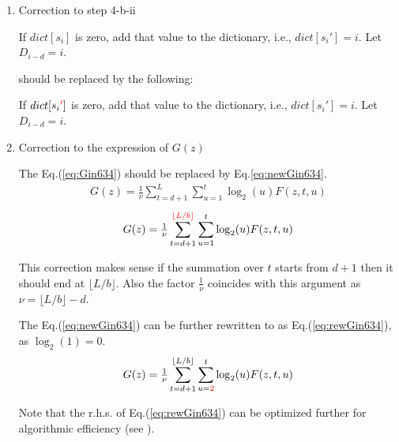 ﻿\documentclass[a4paper,xelatex,english]{bxjsreport}
\begin{document}
\begin{enumerate}
	\item Correction to step 4-b-ii

\begin{shadebox}
\begin{algorithmic}
\State If $dict[s_{i}]$ is zero, add that value to the dictionary, i.e., $dict[s_{i}'] =i$. Let $D_{i-d} = i$.
\end{algorithmic}
\end{shadebox}
should be replaced by the following:
\begin{shadebox}
\begin{algorithmic}
\State If $dict[s_{i} \textcolor{red}{'}]$ is zero, add that value to the dictionary, i.e., $dict[s_{i}'] =i$. Let $D_{i-d} = i$.
\end{algorithmic}
\end{shadebox}

	\item Correction to the expression of $G(z)$

The Eq.(\ref{eq:Gin634}) should be replaced by Eq.\ref{eq:newGin634}.
\begin{align}
G(z) = \tfrac{1}{\nu} 
\sum_{t = d + 1}^{L} 
\sum_{u = 1}^{t} 
\log_{2}(u) F(z, t, u)  \label{eq:Gin634}
\end{align}
\begin{align}
G(z) = \tfrac{1}{\nu} 
\sum_{t = d + 1}^{ \textcolor{red}{\lfloor L / b \rfloor}} 
\sum_{u = 1}^{t} 
\log_{2}(u) F(z, t, u)  \label{eq:newGin634}
\end{align}

This correction makes sense if the summation over $t$ starts from $d + 1$ then it should end at $\lfloor L / b \rfloor$.  Also the factor $\tfrac{1}{\nu}$ coincides with this argument as $\nu = \lfloor L / b \rfloor - d$.

The Eq.(\ref{eq:newGin634}) can be further rewritten to as Eq.(\ref{eq:rewGin634}), as $\log_{2}(1) = 0$.
\begin{align}
G(z) = \tfrac{1}{\nu} 
\sum_{t = d + 1}^{\lfloor L / b \rfloor} 
\sum_{u = \textcolor{red}{2}}^{t} 
\log_{2}(u) F(z, t, u)  \label{eq:rewGin634}
\end{align}

Note that the r.h.s. of Eq.(\ref{eq:rewGin634}) can be optimized further for algorithmic efficiency (see \cite{SP80090BImpNotes}).
\end{enumerate}
\end{document}
